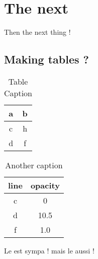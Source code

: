 \chapter{The next}

Then the next thing !

\section{Making tables ?}

\begin{table}[h]
    \centering
    \begin{tabular}{c|c}
        \hline
        a & b \\
        \hline
        c & h\\
        d & f
    \end{tabular}
    \caption{Table Caption}
\end{table}

\begin{table}[h]
    \centering
    \begin{tabular}{c|c}
        \hline
        line & opacity \\
        \hline
        c & 0\\
        d & 10.5 \\
        f & 1.0
    \end{tabular}
    \caption{Another caption}
\end{table}

Le   est sympa ! mais le  aussi !